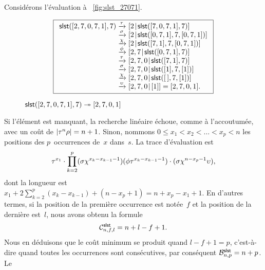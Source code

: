 Considérons l'évaluation à \fig~\vref{fig:slst_27071}.
\begin{figure}
\begin{equation*}
\boxed{%
\begin{array}{r@{\;}l@{\;}l}
\fun{slst}([2,7,0,7,1],7)
& \xrightarrow{\smash{\tau}}
& \cons{2}{\fun{slst}([7,0,7,1],7)}\\
& \xrightarrow{\smash{\sigma}}
& \cons{2}{\fun{slst}([0,7,1],7,[0,7,1])}\\
& \xrightarrow{\smash{\chi}}
& \cons{2}{\fun{slst}([7,1],7,[0,7,1])}\\
& \xrightarrow{\smash{\phi}}
& \cons{2,7}{\fun{slst}([0,7,1],7)}\\
& \xrightarrow{\smash{\tau}}
& \cons{2,7,0}{\fun{slst}([7,1],7)}\\
& \xrightarrow{\smash{\sigma}}
& \cons{2,7,0}{\fun{slst}([1],7,[1])}\\
& \xrightarrow{\smash{\chi}}
& \cons{2,7,0}{\fun{slst}(\el,7,[1])}\\
& \xrightarrow{\smash{\upsilon}}
& \cons{2,7,0}{[1]} = [2,7,0,1].
\end{array}}
\end{equation*}
\caption{\(\fun{slst}([2,7,0,7,1],7) \twoheadrightarrow [2,7,0,1]\)}
\label{fig:slst_27071}
\end{figure}
Si l'élément est manquant, la recherche linéaire échoue, comme à
l'accoutumée, avec un coût de \(\len{\tau^n\rho} = n + 1\). Sinon,
nommons \( 0 \leqslant x_1 < x_2 < \dots < x_p < n\) les positions des
\(p\)~occurrences de~\(x\) dans~\(s\). La trace
d'évaluation est
\begin{equation*}
\abovedisplayskip=0pt
\belowdisplayskip=0pt
\tau^{x_1}
\cdot
\prod_{k=2}^{p}(\sigma\chi^{x_k-x_{k-1}-1})(\phi\tau^{x_k-x_{k-1}-1})
\cdot
(\sigma\chi^{n-x_p-1}\upsilon),
\end{equation*}
dont la longueur est \(x_1 + 2\sum_{k=2}^{p}(x_k-x_{k-1}) + (n - x_p +
1) = n + x_p - x_1 + 1\). En d'autres termes, si la position de la
première occurrence est notée~\(f\) et la position de la dernière
est~\(l\), nous avons obtenu la formule
\begin{equation*}
\C{\fun{slst}}{n,f,l} = n + l - f + 1.
\end{equation*}
Nous en déduisons que le coût minimum se produit quand \(l-f+1 = p\), c'est-à-dire quand toutes
les occurrences sont consécutives, par conséquent
\(\B{\fun{slst}}{n,p} = n + p\). Le
